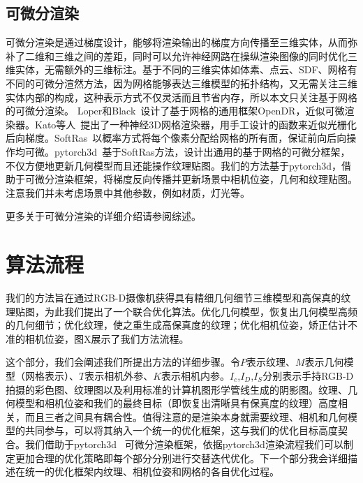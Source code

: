 \subsection{可微分渲染}
可微分渲染是通过梯度设计，能够将渲染输出的梯度方向传播至三维实体，从而弥补了二维和三维之间的差距，同时可以允许神经网路在操纵渲染图像的同时优化三维实体，无需额外的三维标注。基于不同的三维实体如体素、点云、SDF、网格有不同的可微分渲然方法，因为网格能够表达三维模型的拓扑结构，又无需关注三维实体内部的构成，这种表示方式不仅灵活而且节省内存，所以本文只关注基于网格的可微分渲染。
Loper和Black~\cite{MatthewLoper2014OpenDRAA}设计了基于网格的通用框架OpenDR，近似可微渲染器。Kato等人~\cite{MatthiasNiener2013Realtime3R}提出了一种神经3D网格渲染器，用手工设计的函数来近似光栅化后向梯度。SoftRas~\cite{ShichenLiu2019SoftRA}以概率方式将每个像素分配给网格的所有面，保证前向后向操作均可微。pytorch3d~\cite{ravi2020pytorch3d}基于SoftRas方法，设计出通用的基于网格的可微分框架，不仅方便地更新几何模型而且还能操作纹理贴图。我们的方法基于pytorch3d，借助于可微分渲染框架，将梯度反向传播并更新场景中相机位姿，几何和纹理贴图。注意我们并未考虑场景中其他参数，例如材质，灯光等。\par
更多关于可微分渲染的详细介绍请参阅综述\cite{HiroharuKato2020DifferentiableRA}。

\section{算法流程}

我们的方法旨在通过RGB-D摄像机获得具有精细几何细节三维模型和高保真的纹理贴图，为此我们提出了一个联合优化算法。优化几何模型，恢复出几何模型高频的几何细节；优化纹理，使之重生成高保真度的纹理；优化相机位姿，矫正估计不准的相机位姿，图X展示了我们方法流程。\par
这个部分，我们会阐述我们所提出方法的详细步骤。令$P$表示纹理、$M$表示几何模型（网格表示）、$T$表示相机外参、$K$表示相机内参。$I_c$,$I_D$,$I_S$分别表示手持RGB-D拍摄的彩色图、纹理图以及利用标准的计算机图形学管线生成的阴影图。纹理、几何模型和相机位姿和我们的最终目标（即恢复出清晰具有保真度的纹理）高度相关，而且三者之间具有耦合性。值得注意的是渲染本身就需要纹理、相机和几何模型的共同参与，可以将其纳入一个统一的优化框架，这与我们的优化目标高度契合。我们借助于pytorch3d ~\cite{ravi2020pytorch3d}可微分渲染框架，依据pytorch3d渲染流程我们可以制定更加合理的优化策略即每个部分分别进行交替迭代优化。下一个部分我会详细描述在统一的优化框架内纹理、相机位姿和网格的各自优化过程。\par
